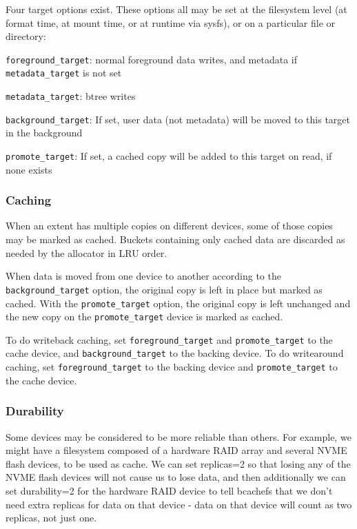 \documentclass{article}
\begin{document}
Four target options exist. These options all may be set at the filesystem level
(at format time, at mount time, or at runtime via sysfs), or on a particular
file or directory:

\begin{description}
	\item \texttt{foreground\_target}: normal foreground data writes, and
		metadata if \\ \texttt{metadata\_target} is not set
	\item \texttt{metadata\_target}: btree writes
	\item \texttt{background\_target}: If set, user data (not metadata) will
		be moved to this target in the background
	\item\texttt{promote\_target}: If set, a cached copy will be added to
		this target on read, if none exists
\end{description}

\subsubsection{Caching}

When an extent has multiple copies on different devices, some of those copies
may be marked as cached. Buckets containing only cached data are discarded as
needed by the allocator in LRU order.

When data is moved from one device to another according to the \\
\texttt{background\_target} option, the original copy is left in place but
marked as cached. With the \texttt{promote\_target} option, the original copy is
left unchanged and the new copy on the \texttt{promote\_target} device is marked
as cached.

To do writeback caching, set \texttt{foreground\_target} and
\texttt{promote\_target} to the cache device, and \texttt{background\_target} to
the backing device. To do writearound caching, set \texttt{foreground\_target}
to the backing device and \texttt{promote\_target} to the cache device.

\subsubsection{Durability}

Some devices may be considered to be more reliable than others. For example, we
might have a filesystem composed of a hardware RAID array and several NVME flash
devices, to be used as cache. We can set replicas=2 so that losing any of the
NVME flash devices will not cause us to lose data, and then additionally we can
set durability=2 for the hardware RAID device to tell bcachefs that we don't
need extra replicas for data on that device - data on that device will count as
two replicas, not just one.
\end{document}
